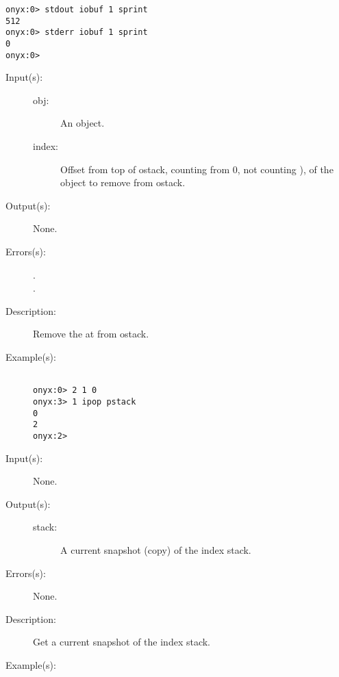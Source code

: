 \begin{description}
\begin{description}
\begin{verbatim}
onyx:0> stdout iobuf 1 sprint
512
onyx:0> stderr iobuf 1 sprint
0
onyx:0>
		\end{verbatim}
	\end{description}
\label{systemdict:ipop}
\item[{\onyxop{obj \dots index}{ipop}{\dots}}: ]
	\begin{description}\item[]
	\item[Input(s): ]
		\begin{description}\item[]
		\item[obj: ]
			An object.
		\item[index: ]
			Offset from top of ostack, counting from 0, not counting
			), of the object to remove from ostack.
		\end{description}
	\item[Output(s): ] None.
	\item[Errors(s): ]
		\begin{description}\item[]
		\item[.]
		\item[.]
		\end{description}
	\item[Description: ]
		Remove the  at  from ostack.
	\item[Example(s): ]\begin{verbatim}

onyx:0> 2 1 0 
onyx:3> 1 ipop pstack
0
2
onyx:2>
		\end{verbatim}
	\end{description}
\label{systemdict:istack}
\item[{\onyxop{--}{istack}{stack}}: ]
	\begin{description}\item[]
	\item[Input(s): ] None.
	\item[Output(s): ]
		\begin{description}\item[]
		\item[stack: ]
			A current snapshot (copy) of the index stack.
		\end{description}
	\item[Errors(s): ] None.
	\item[Description: ]
		Get a current snapshot of the index stack.
	\item[Example(s): ]\begin{verbatim}


\end{verbatim}
\end{description}
\end{description}
